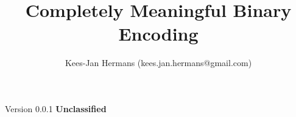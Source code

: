 \documentclass[twoside,a4paper]{refart}
\title{Completely Meaningful Binary Encoding}
\begin{document}
\maketitle

\begin{flushright}
\author{Kees-Jan Hermans (kees.jan.hermans@gmail.com)}
\date{}
\end{flushright}



\vfill
\begin{flushright}
Version 0.0.1
\textbf{Unclassified}

\end{flushright}

\newpage
\tableofcontents

\raggedbottom

\newpage






\printindex
\end{document}
